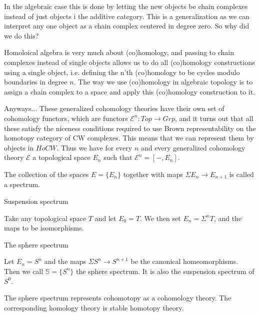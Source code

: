 In the algebraic case this is done by letting the new objects be chain complexes instead of just objects i the additive category. 
This is a generalization as we can interpret any one object as a chain complex centered in degree zero. 
So why did we do this?

Homoloical algebra is very much about (co)homology, 
and passing to chain complexes instead of single objects allows us to do all (co)homology constructions using a single object, 
i.e. defining the n'th (co)homology to be cycles modulo boundaries in degree $n$. 
The way we use (co)homology in algebraic topology is to assign a chain complex to a space and apply this (co)homology construction to it. 


Anyways... 
These generalized cohomology theories have their own set of cohomology functors, 
which are functors $\mathcal{E}^n:Top \longrightarrow Grp$, 
and it turns out that all these satisfy the niceness conditions required to use Brown representability on the homotopy category of CW complexes. 
This means that we can represent them by objects in $HoCW$. 
Thus we have for every $n$ and every generalized cohomology theory $\mathcal{E}$ a topological space $E_n$ such that $\mathcal{E}^n = [-, E_n]$. 

The collection of the spaces $E = \{E_n\}$ together with maps $\Sigma E_n \longrightarrow E_{n+1}$ is called a spectrum. 


\begin{example}{Suspension spectrum}

Take any topological space $T$ and let $E_0 = T$. 
We then set $E_n = \Sigma^n T$, and the maps to be isomorphisms. 
\end{example}

\begin{example}{The sphere spectrum}
    
    Let $E_n = S^n$ and the maps $\Sigma S^n \longrightarrow S^{n+1}$ be the canonical homeomorphisms. 
    Then we call $\mathbb{S}=\{S^n\}$ the sphere spectrum. 
    It is also the suspension spectrum of $S^0$.
\end{example}

The sphere spectrum represents cohomotopy as a cohomology theory. 
The corresponding homology theory is stable homotopy theory. 

